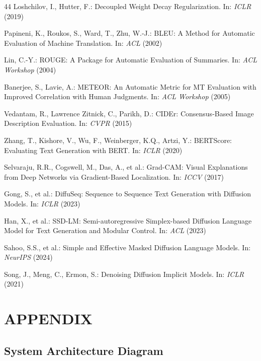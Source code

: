 \documentclass[9pt]{report}
\begin{document}
\begin{thebibliography}{44}
Loshchilov, I., Hutter, F.: Decoupled Weight Decay Regularization. In: \textit{ICLR} (2019)

Papineni, K., Roukos, S., Ward, T., Zhu, W.-J.: BLEU: A Method for Automatic Evaluation of Machine Translation. In: \textit{ACL} (2002)

Lin, C.-Y.: ROUGE: A Package for Automatic Evaluation of Summaries. In: \textit{ACL Workshop} (2004)

Banerjee, S., Lavie, A.: METEOR: An Automatic Metric for MT Evaluation with Improved Correlation with Human Judgments. In: \textit{ACL Workshop} (2005)

Vedantam, R., Lawrence Zitnick, C., Parikh, D.: CIDEr: Consensus-Based Image Description Evaluation. In: \textit{CVPR} (2015)

Zhang, T., Kishore, V., Wu, F., Weinberger, K.Q., Artzi, Y.: BERTScore: Evaluating Text Generation with BERT. In: \textit{ICLR} (2020)

Selvaraju, R.R., Cogswell, M., Das, A., et al.: Grad-CAM: Visual Explanations from Deep Networks via Gradient-Based Localization. In: \textit{ICCV} (2017)

Gong, S., et al.: DiffuSeq: Sequence to Sequence Text Generation with Diffusion Models. In: \textit{ICLR} (2023)

Han, X., et al.: SSD-LM: Semi-autoregressive Simplex-based Diffusion Language Model for Text Generation and Modular Control. In: \textit{ACL} (2023)

Sahoo, S.S., et al.: Simple and Effective Masked Diffusion Language Models. In: \textit{NeurIPS} (2024)

Song, J., Meng, C., Ermon, S.: Denoising Diffusion Implicit Models. In: \textit{ICLR} (2021)

\end{thebibliography}

\appendix
\chapter{APPENDIX}

\section{System Architecture Diagram}
\end{document}
